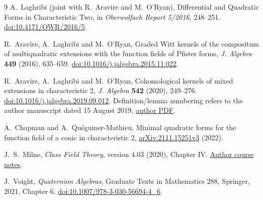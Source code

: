\documentclass[11pt]{article}
\begin{document}
\begin{thebibliography}{9}
A.~Laghribi (joint with R.~Aravire and M.~O'Ryan),
Differential and Quadratic Forms in Characteristic Two,
in \emph{Oberwolfach Report 5/2016}, 248--251.
\href{https://doi.org/10.4171/OWR/2016/5}{doi:10.4171/OWR/2016/5}.

R.~Aravire, A.~Laghribi and M.~O'Ryan,
Graded Witt kernels of the compositum of multiquadratic extensions
with the function fields of Pfister forms,
\emph{J. Algebra} \textbf{449} (2016), 635--659.
\href{https://doi.org/10.1016/j.jalgebra.2015.11.022}{doi:10.1016/j.jalgebra.2015.11.022}.

R.~Aravire, A.~Laghribi and M.~O'Ryan,
Cohomological kernels of mixed extensions in characteristic 2,
\emph{J. Algebra} \textbf{542} (2020), 249--276.
\href{https://doi.org/10.1016/j.jalgebra.2019.09.012}{doi:10.1016/j.jalgebra.2019.09.012}.
Definition/lemma numbering refers to the author manuscript dated
15 August 2019,
\href{https://laghribi.perso.math.cnrs.fr/cohom-kernels.pdf}{author PDF}.

A.~Chapman and A.~Qu\'eguiner-Mathieu,
Minimal quadratic forms for the function field of a conic in characteristic 2,
\href{https://arxiv.org/abs/2111.15251v3}{arXiv:2111.15251v3} (2022).

J.~S.~Milne, \emph{Class Field Theory}, version 4.03 (2020), Chapter IV.
\href{https://www.jmilne.org/math/CourseNotes/CFT.pdf}{Author course notes}.

J.~Voight, \emph{Quaternion Algebras}, Graduate Texts in Mathematics 288,
Springer, 2021, Chapter 6.
\href{https://doi.org/10.1007/978-3-030-56694-4_6}{doi:10.1007/978-3-030-56694-4\_6}.
\end{thebibliography}
\end{document}
